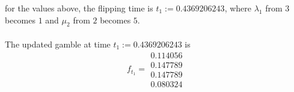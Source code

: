 \documentclass{article}
\begin{document}
for the values above, the flipping time is $t_{1}:= 0.4369206243$, where $\lambda_{1}$ from $3$ becomes $1$ and $\mu_{2}$ from $2$ becomes $5$.\\\\
The updated gamble at time $t_{1}:= 0.4369206243$ is
\begin{equation*} 
 f_{t_1}= 
 \begin{array}{|c|}
  0.114056\\
  0.147789\\
  0.147789\\
  0.080324  
 \end{array}
 \end{equation*}\\\\\\
\end{document}
